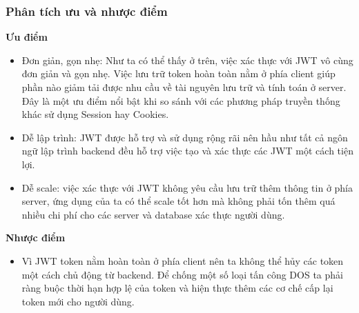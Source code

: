 \subsubsection{Phân tích ưu và nhược điểm}
\textbf{Ưu điểm}
\begin{itemize}
    \item Đơn giản, gọn nhẹ: Như ta có thể thấy ở trên, việc xác thực với JWT vô cùng đơn giản và gọn nhẹ. Việc lưu trữ token hoàn toàn nằm ở phía client giúp phần nào giảm tải được nhu cầu về tài nguyên lưu trữ và tính toán ở server. Đây là một ưu điểm nổi bật khi so sánh với các phương pháp truyền thống khác sử dụng Session hay Cookies.
    \item Dễ lập trình: JWT được hỗ trợ và sử dụng rộng rãi nên hầu như tất cả ngôn ngữ lập trình backend đều hỗ trợ việc tạo và xác thực các JWT một cách tiện lợi.
    \item Dễ scale: việc xác thực với JWT không yêu cầu lưu trữ thêm thông tin ở phía server, ứng dụng của ta có thể scale tốt hơn mà không phải tốn thêm quá nhiều chi phí cho các server và database xác thực người dùng.
\end{itemize}
\textbf{Nhược điểm}
\begin{itemize}
    \item  Vì JWT token nằm hoàn toàn ở phía client nên ta không thể hủy các token một cách chủ động từ backend. Để chống một số loại tấn công DOS ta phải ràng buộc thời hạn hợp lệ của token và hiện thực thêm các cơ chế cấp lại token mới cho người dùng.
\end{itemize}